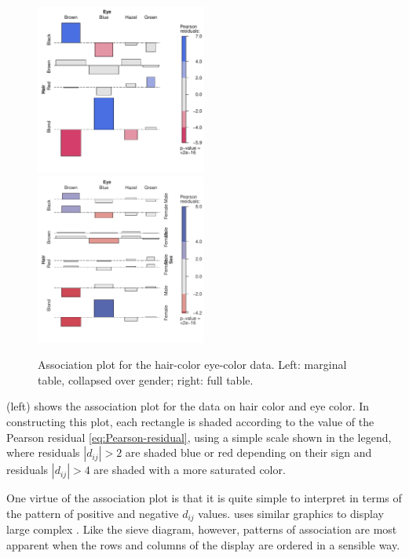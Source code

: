 \documentclass[10pt,krantz2]{krantz}\usepackage[]{graphicx}\usepackage[]{color}
\newenvironment{knitrout}{}{} %
\renewenvironment{knitrout}{\small\renewcommand{\baselinestretch}{.85}}{} %
\begin{document}
\begin{knitrout}
\color{fgcolor}\begin{figure}[!htbp]

\centerline{\includegraphics[width=0.5\textwidth]{ch04/fig/HE-assoc-1} 
\includegraphics[width=0.5\textwidth]{ch04/fig/HE-assoc-2} }

\caption[Association plot for the hair-color eye-color data]{Association plot for the hair-color eye-color data. Left: marginal table, collapsed over gender; right: full table.\label{fig:HE-assoc}}
\end{figure}


\end{knitrout}
 (left) shows the association plot for the data on
hair color and eye color.
In constructing this plot, each rectangle is shaded according to
the value of the Pearson residual \eqref{eq:Pearson-residual},
using a simple scale shown in the legend, where residuals
$|d_{ij}| > 2$ are shaded blue or red depending on their sign
and residuals $|d_{ij}| > 4$
are shaded with a more saturated color.

One virtue of the association plot is that it is quite simple to
interpret in terms of the pattern of
positive and negative  $d_{ij}$ values.
\citet{Bertin:81} uses similar graphics to display large complex
\ctabs.  Like the sieve diagram, however, patterns of association
are most apparent when the rows and columns of the display are ordered
in a sensible way.
\end{document}
